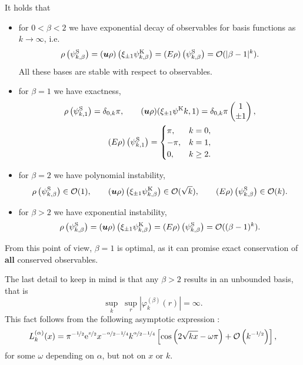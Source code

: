 \begin{corollary} \label{cor:polobs}
It holds that
\begin{itemize}
\item for $0<\beta<2$ we have exponential decay of observables for basis functions as $k\to\infty$, i.e.
\[
    \rho\left(\psi^{\mathrm{S}}_{k,\beta}\right) = ({\bm u}\rho)\left(\xi_{\pm1}\psi^{\mathrm{K}}_{k,\beta}\right)
    = (E\rho)\left(\psi^{\mathrm{S}}_{k,\beta}\right) = \mathcal{O}(|\beta-1|^k).
\]
All these bases are stable with respect to observables.
\item for $\beta=1$ we have exactness,
\begin{gather*}
    \rho\left(\psi^{\mathrm{S}}_{k,1}\right) = \delta_{0,k}\pi, \qquad
    ({\bm u}\rho)(\xi_{\pm1}\psi^{\mathrm{K}}{k,1}) = \delta_{0,k} \pi \begin{pmatrix}1\\\pm1\end{pmatrix},\\
    (E\rho)\left(\psi^{\mathrm{S}}_{k,1}\right) = \begin{cases} \pi,&k=0,\\ -\pi,&k=1,\\ 0,&k\geq2. \end{cases}
\end{gather*}
\item for $\beta=2$ we have polynomial instability,
\[
    \rho\left(\psi^{\mathrm{S}}_{k,\beta}\right) \in \mathcal{O}(1), \qquad
    ({\bm u}\rho)\left(\xi_{\pm1}\psi^{\mathrm{K}}_{k,\beta}\right) \in \mathcal{O}(\sqrt{k}), \qquad
    (E\rho)\left(\psi^{\mathrm{S}}_{k,\beta}\right) \in \mathcal{O}(k).
\]
\item for $\beta>2$ we have exponential instability,
\[
    \rho\left(\psi^{\mathrm{S}}_{k,\beta}\right) = ({\bm u}\rho)\left(\xi_{\pm1}\psi^{\mathrm{K}}_{k,\beta}\right)
    = (E\rho)\left(\psi^{\mathrm{S}}_{k,\beta}\right) = \mathcal{O}((\beta-1)^k).
\]
\end{itemize}
\end{corollary}
From this point of view, $\beta=1$ is optimal, as it can promise exact conservation of {\bf all} conserved
observables.

The last detail to keep in mind is that any $\beta>2$ results in an unbounded basis, that is
\[
    \sup_k \; \sup_r \left|\varphi^{(\beta)}_k(r)\right| = \infty.
\]
This fact follows from the following asymptotic expression \cite[Equation 2.12]{Gavrilyuk2011qtc}:
\[
    L_k^{(\alpha)}(x) = \pi^{-\nicefrac{1}{2}} \mathrm{e}^{\nicefrac{x}{2}}
                        x^{-\nicefrac{\alpha}{2}-\nicefrac{1}{4}}
                        k^{\nicefrac{\alpha}{2}-\nicefrac{1}{4}}
                        \left[ \cos\left(2\sqrt{kx}-\omega\pi\right) +
                               \mathcal{O}\left(k^{-\nicefrac{1}{2}}\right)
                        \right],
\]
for some $\omega$ depending on $\alpha$, but not on $x$ or $k$.

